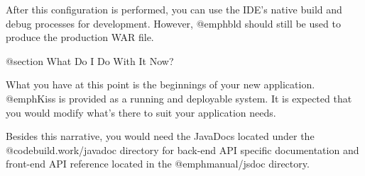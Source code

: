 After this configuration is performed, you can use the IDE's native
build and debug processes for development.  However, @emph{bld} should
still be used to produce the production WAR file.


@section What Do I Do With It Now?

What you have at this point is the beginnings of your new application.
@emph{Kiss} is provided as a running and deployable system.  It is
expected that you would modify what's there to suit your application
needs.

Besides this narrative, you would need the JavaDocs located under the
@code{build.work/javadoc} directory for back-end API specific documentation and
front-end API reference located in the @emph{manual/jsdoc} directory.

